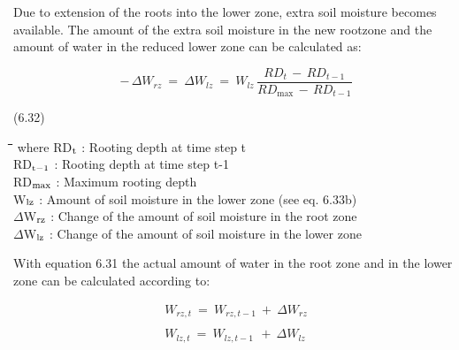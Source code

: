\documentclass[11pt]{article}
\begin{document}
\bigskip
\bigskip
 Due to extension of the roots into the lower zone, extra soil moisture becomes available.
The amount of the extra soil moisture in the new rootzone and the amount of water in the
reduced lower zone can be calculated as:

\begin{displaymath}
-\, \Delta W _{rz} ~=~\Delta W _{lz} ~=~ W _{lz} \,{\frac{ RD _{t} \, -\, RD _{t-1} }{RD _{\max } \, -\, RD _{t-1} }}
\end{displaymath}

 \bigskip
\strut\hfill (6.32)

\nwln
\begin{tabbing}
\hspace{1.27cm}\=\hspace{1.27cm}\=\hspace{1.27cm}\=\hspace{1.27cm}\=%
\hspace{1.27cm}\=\hspace{1.27cm}\=\hspace{1.27cm}\=\hspace{1.27cm}\=%
\hspace{1.27cm}\=\hspace{1.27cm}\=\kill
where\> RD$_{{\rm t}}$\> : Rooting depth at time step t\> \> \> \> \> \> \> \> [cm]\\
\>RD$_{{\rm t-1}}$\> : Rooting depth at time step t-1\> \> \> \> \> \> \> \> [cm]\\
\>RD$_{{\rm max}}$\> : Maximum rooting depth\> \> \> \> \> \> \> \> [cm]\\
\>W$_{{\rm lz}}$\> : Amount of soil moisture in the lower zone (see eq. 6.33b)\> \> \> \> \> \> \> \> [cm]\\
\>$\Delta$W$_{{\rm rz}}$\> : Change of the amount of soil moisture in the root zone\> \> \> \> \> \> \> \> [cm]\\
\>$\Delta$W$_{{\rm lz}}$\> : Change of the amount of soil moisture in the lower zone\> \> \> \> \> \> \> \> [cm]
\end{tabbing}

\bigskip
\bigskip
With equation 6.31 the actual amount of water in the root zone and in the lower zone can
be calculated according to:

\begin{eqnarray*}
 W _{rz,t} ~=~ W _{rz, t-1} ~+~ \Delta W _{rz} \nonumber  \\
~ \nonumber  \\
W _{lz,t} ~=~ W _{lz, t-1} ~\, +~ \Delta W _{lz}
\end{eqnarray*}
\end{document}
